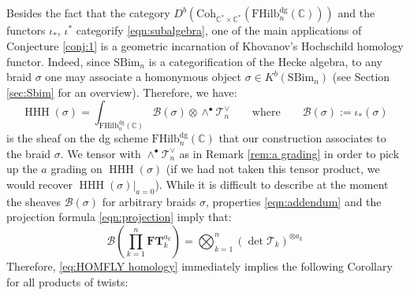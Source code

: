\documentclass[12pt]{amsart}
\numberwithin{equation}{section}
\newtheorem{corollary}[theorem]{Corollary}
\theoremstyle{definition}
\theoremstyle{remark}
\DeclareMathOperator{\HHH}{HHH}
\newcommand{\CC}{\mathbb{C}}
\newcommand{\CB}{\mathcal{B}}
\newcommand{\CT}{\mathcal{T}}
\newcommand{\FT}{\mathbf{FT}}
\renewcommand{\1}{\mathbf{1}}
\newcommand{\coh}{\mathrm{Coh}}
\newcommand{\FH}{\mathrm{FHilb}}
\newcommand{\SBim}{\mathrm{SBim}}
\newcommand{\torus}{\CC^{*} \times \CC^*}
\newcommand{\dg}{\text{dg}}%
\newcommand{\edg}{\emph{dg}}
\begin{document}










\subsection{}
\label{sub:intro homology}

Besides the fact that the category $D^b(\coh_{\torus} (\FH_n^\dg(\CC)))$ and the functors $\iota_*$, $\iota^*$ categorify \eqref{eqn:subalgebra}, one of the main applications of Conjecture \ref{conj:1} is a geometric incarnation of Khovanov's Hochschild homology functor. Indeed, since $\SBim_n$ is a categorification of the Hecke algebra, to any braid $\sigma$ one may associate a homonymous object $\sigma \in K^b(\SBim_n)$ (see Section \ref{sec:Sbim} for an overview). Therefore, we have:
\begin{equation}
\label{eq:HOMFLY homology}
\HHH(\sigma) = \int_{\FH_n^\dg(\CC)} \CB(\sigma) \otimes \wedge^\bullet \CT_n^\vee \qquad \text{where} \qquad \CB(\sigma) :=\iota_*(\sigma)
\end{equation}
is the sheaf on the dg scheme $\FH_n^\dg(\CC)$ that our construction associates to the braid $\sigma$. We tensor with $\wedge^\bullet \CT_n^\vee$ as in Remark \ref{rem:a grading} in order to pick up the $a$ grading on $\HHH(\sigma)$ (if we had not taken this tensor product, we would recover $\HHH(\sigma)|_{a=0}$). While it is difficult to describe at the moment the sheaves $\CB(\sigma)$ for arbitrary braids $\sigma$, properties \eqref{eqn:addendum} and the projection formula \eqref{eqn:projection} imply that:
$$
\CB\left(\prod_{k=1}^n \FT_k^{a_k}\right) = \bigotimes_{k=1}^n ( \det \CT_k)^{\otimes a_k}
$$
Therefore, \eqref{eq:HOMFLY homology} immediately implies the following Corollary for all products of twists:
\end{document}
